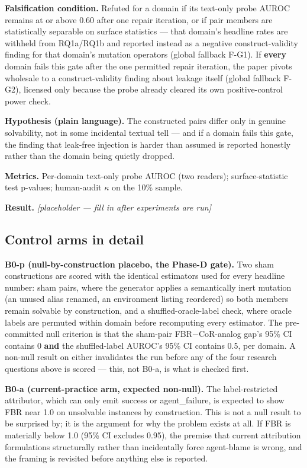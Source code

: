 \documentclass[11pt]{article}
\newcommand{\ph}{\textit{[placeholder --- fill in after experiments are run]}}
\begin{document}
\textbf{Falsification condition.} Refuted for a domain if its text-only probe AUROC remains at or above 0.60 after one repair iteration, or if pair members are statistically separable on surface statistics --- that domain's headline rates are withheld from RQ1a/RQ1b and reported instead as a negative construct-validity finding for that domain's mutation operators (global fallback F-G1). If \textbf{every} domain fails this gate after the one permitted repair iteration, the paper pivots wholesale to a construct-validity finding about leakage itself (global fallback F-G2), licensed only because the probe already cleared its own positive-control power check.

\textbf{Hypothesis (plain language).} The constructed pairs differ only in genuine solvability, not in some incidental textual tell --- and if a domain fails this gate, the finding that leak-free injection is harder than assumed is reported honestly rather than the domain being quietly dropped.

\textbf{Metrics.} Per-domain text-only probe AUROC (two readers); surface-statistic test p-values; human-audit $\kappa$ on the 10\% sample.

\textbf{Result.} \ph

\subsection{Control arms in detail}

\textbf{B0-p (null-by-construction placebo, the Phase-D gate).} Two sham constructions are scored with the identical estimators used for every headline number: sham pairs, where the generator applies a semantically inert mutation (an unused alias renamed, an environment listing reordered) so both members remain solvable by construction, and a shuffled-oracle-label check, where oracle labels are permuted within domain before recomputing every estimator. The pre-committed null criterion is that the sham-pair FBR$-$CoR-analog gap's 95\% CI contains 0 \textbf{and} the shuffled-label AUROC's 95\% CI contains 0.5, per domain. A non-null result on either invalidates the run before any of the four research questions above is scored --- this, not B0-a, is what is checked first.

\textbf{B0-a (current-practice arm, expected non-null).} The label-restricted attributor, which can only emit success or agent\_failure, is expected to show FBR near 1.0 on unsolvable instances by construction. This is not a null result to be surprised by; it is the argument for why the problem exists at all. If FBR is materially below 1.0 (95\% CI excludes 0.95), the premise that current attribution formulations structurally rather than incidentally force agent-blame is wrong, and the framing is revisited before anything else is reported.
\end{document}
